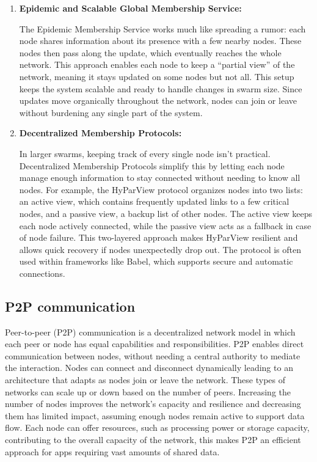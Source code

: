 \begin{enumerate}
  \item \textbf{Epidemic and Scalable Global Membership Service:}
  
  The Epidemic Membership Service works much like spreading a rumor: each node shares information about its presence with a few nearby nodes. These nodes then pass along the update, which eventually reaches the whole network. This approach enables each node to keep a “partial view” of the network, meaning it stays updated on some nodes but not all. This setup keeps the system scalable and ready to handle changes in swarm size. Since updates move organically throughout the network, nodes can join or leave without burdening any single part of the system.
  
  
  \item \textbf{Decentralized Membership Protocols:}
  
  In larger swarms, keeping track of every single node isn’t practical. Decentralized Membership Protocols simplify this by letting each node manage enough information to stay connected without needing to know all nodes. For example, the HyParView protocol organizes nodes into two lists: an active view, which contains frequently updated links to a few critical nodes, and a passive view, a backup list of other nodes. The active view keeps each node actively connected, while the passive view acts as a fallback in case of node failure. This two-layered approach makes HyParView resilient and allows quick recovery if nodes unexpectedly drop out. The protocol is often used within frameworks like Babel, which supports secure and automatic connections. 
     

\end{enumerate}

\subsection{P2P communication}
\label{sec:p2p_communication}

Peer-to-peer (P2P) communication is a decentralized network model in which each peer or node has equal capabilities and responsibilities. \gls{P2P} enables direct communication between nodes, without needing a central authority to mediate the interaction.
  Nodes can connect and disconnect dynamically leading to an architecture that adapts as nodes join or leave the network. 
  These types of networks can scale up or down based on the number of peers. Increasing the number of nodes improves the network's capacity and resilience and decreasing them has limited impact, assuming enough nodes remain active to support data flow. Each node can offer resources, such as processing power or storage capacity, contributing to the overall capacity of the network, this makes \gls{P2P} an efficient approach for apps requiring vast amounts of shared data.
  
